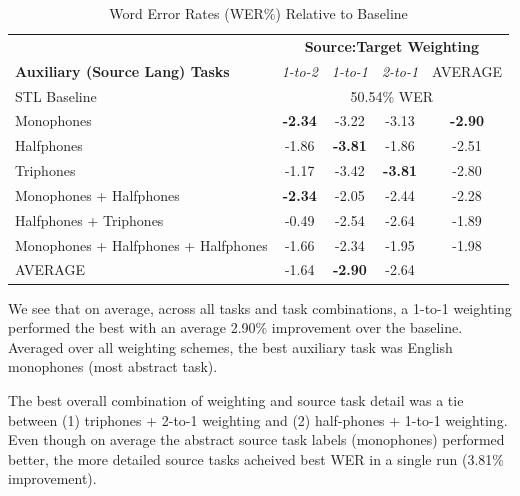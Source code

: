 \documentclass[a4paper]{article}
\begin{document}
\begin{table}[!htbp]
  \centering
  \caption{Word Error Rates (WER\%) Relative to Baseline}
    \label{tab:results}
  \begin{adjustbox}{width=.475\textwidth}
    \begin{tabular}{lcccc}
      \toprule
      & \multicolumn{4}{c}{\textbf{Source:Target Weighting}} \\
      \textbf{Auxiliary (Source Lang) Tasks} & \textit{1-to-2} & \textit{1-to-1} & \textit{2-to-1} & AVERAGE\\
      \midrule
      STL Baseline                          &               \multicolumn{4}{c}{50.54\% WER}  \\
      Monophones                            & \textbf{-2.34}  & -3.22           & -3.13           & \textbf{-2.90}\\
      Halfphones                            & -1.86           & \textbf{-3.81}  & -1.86           & -2.51\\
      Triphones                             & -1.17           & -3.42           & \textbf{-3.81}  & -2.80\\
      Monophones + Halfphones               & \textbf{-2.34}  & -2.05           & -2.44           & -2.28\\
      Halfphones + Triphones                & -0.49           & -2.54           & -2.64           & -1.89\\
      Monophones + Halfphones + Halfphones  & -1.66           & -2.34           & -1.95           & -1.98\\
      \midrule
      AVERAGE                               & -1.64           & \textbf{-2.90}  & -2.64           & \\
      \bottomrule
    \end{tabular}
  \end{adjustbox}
\end{table}

We see that on average, across all tasks and task combinations, a 1-to-1 weighting performed the best with an average 2.90\% improvement over the baseline. Averaged over all weighting schemes, the best auxiliary task was English monophones (most abstract task).

The best overall combination of weighting and source task detail was a tie between (1) triphones + 2-to-1 weighting and (2) half-phones + 1-to-1 weighting. Even though on average the abstract source task labels (monophones) performed better, the more detailed source tasks acheived best WER in a single run (3.81\% improvement).
\end{document}
